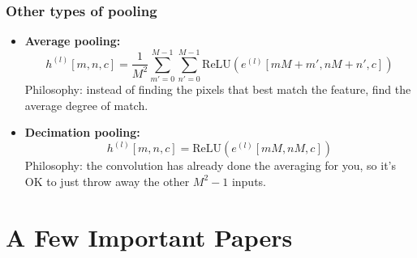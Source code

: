 \documentclass{beamer}
\begin{document}
\begin{frame}
  \frametitle{Other types of pooling}
  \begin{itemize}
  \item {\bf Average pooling:}
    \begin{displaymath}
      h^{(l)}[m,n,c] = \frac{1}{M^2}\sum_{m'=0}^{M-1}\sum_{n'=0}^{M-1} \mbox{ReLU}\left(e^{(l)}[mM+m',nM+n',c]\right)
    \end{displaymath}
    Philosophy: instead of finding the pixels that best match the feature,
    find the average degree of match.
  \item {\bf Decimation pooling:}
    \begin{displaymath}
      h^{(l)}[m,n,c] = \mbox{ReLU}\left(e^{(l)}[mM,nM,c]\right)
    \end{displaymath}
    Philosophy: the convolution has already done the averaging for you, so
    it's OK to just  throw away the other $M^2-1$ inputs.
  \end{itemize}
\end{frame}

\section[Papers]{A Few Important Papers}
\setcounter{subsection}{1}
\end{document}
